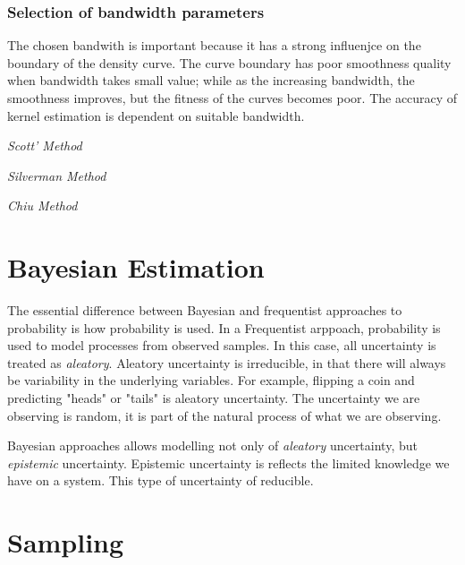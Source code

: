 \subsubsection{Selection of bandwidth parameters}
The chosen bandwith is important because it has a strong influenjce on the boundary of the density curve.  The curve boundary has poor smoothness quality when bandwidth takes small value; while as the increasing bandwidth, the smoothness improves, but the fitness of the curves becomes poor.  The accuracy of kernel estimation is dependent on suitable bandwidth.

\emph{Scott' Method}

\emph{Silverman Method}

\emph{Chiu Method}

\section{Bayesian Estimation}
The essential difference between Bayesian and frequentist approaches to probability is how probability is used.  In a Frequentist arppoach, probability is used to model processes from observed samples.  In this case, all uncertainty is treated as \emph{aleatory}.  Aleatory uncertainty is irreducible, in that there will always be variability in the underlying variables.  For example, flipping a coin and predicting "heads" or "tails" is aleatory uncertainty.  The uncertainty we are observing is random, it is part of the natural process of what we are observing.

Bayesian approaches allows modelling not only of \emph{aleatory} uncertainty, but \emph{epistemic} uncertainty.  Epistemic uncertainty is reflects the limited knowledge we have on a system.   This type of uncertainty of reducible.


\section{Sampling}

